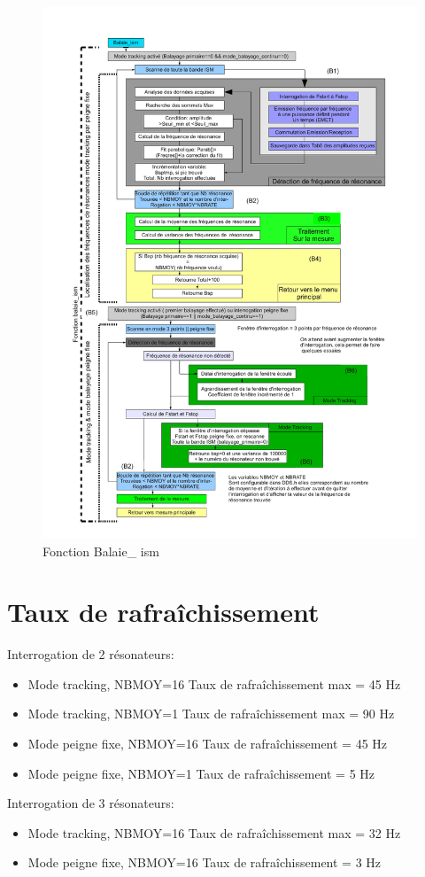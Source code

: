 \documentclass[a4paper]{article}
\begin{document}
\begin{figure}[h!tb]
\includegraphics[width=\linewidth]{algo2}
\caption{Fonction Balaie\_ ism}
\label{hw2}
\end{figure}



\section{Taux de rafra\^ichissement}
Interrogation de 2 r\'esonateurs:
\begin{itemize}
\item Mode tracking, NBMOY=16 Taux de rafra\^ichissement max = 45 Hz
\item Mode tracking, NBMOY=1 Taux de rafra\^ichissement max = 90 Hz
\item Mode peigne fixe, NBMOY=16 Taux de rafra\^ichissement  = 45 Hz
\item Mode peigne fixe, NBMOY=1 Taux de rafra\^ichissement  = 5 Hz
\end{itemize}
Interrogation de 3 r\'esonateurs:
\begin{itemize}
\item Mode tracking, NBMOY=16 Taux de rafra\^ichissement max = 32 Hz
\item Mode peigne fixe, NBMOY=16 Taux de rafra\^ichissement  = 3 Hz
\end{itemize}
\end{document}
